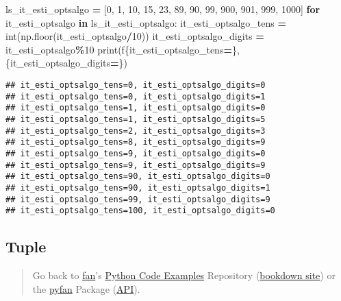 \documentclass[
]{book}
\newenvironment{Shaded}{\begin{snugshade}}{\end{snugshade}}
\newcommand{\BuiltInTok}[1]{#1}
\newcommand{\ControlFlowTok}[1]{\textcolor[rgb]{0.13,0.29,0.53}{\textbf{#1}}}
\newcommand{\DecValTok}[1]{\textcolor[rgb]{0.00,0.00,0.81}{#1}}
\newcommand{\KeywordTok}[1]{\textcolor[rgb]{0.13,0.29,0.53}{\textbf{#1}}}
\newcommand{\NormalTok}[1]{#1}
\newcommand{\OperatorTok}[1]{\textcolor[rgb]{0.81,0.36,0.00}{\textbf{#1}}}
\newcommand{\SpecialCharTok}[1]{\textcolor[rgb]{0.00,0.00,0.00}{#1}}
\newcommand{\SpecialStringTok}[1]{\textcolor[rgb]{0.31,0.60,0.02}{#1}}
\begin{document}
\begin{Shaded}
\begin{Highlighting}[]
\NormalTok{ls\_it\_esti\_optsalgo }\OperatorTok{=}\NormalTok{ [}\DecValTok{0}\NormalTok{, }\DecValTok{1}\NormalTok{, }\DecValTok{10}\NormalTok{, }\DecValTok{15}\NormalTok{, }\DecValTok{23}\NormalTok{, }\DecValTok{89}\NormalTok{, }\DecValTok{90}\NormalTok{, }\DecValTok{99}\NormalTok{, }\DecValTok{900}\NormalTok{, }\DecValTok{901}\NormalTok{, }\DecValTok{999}\NormalTok{, }\DecValTok{1000}\NormalTok{]}
\ControlFlowTok{for}\NormalTok{ it\_esti\_optsalgo }\KeywordTok{in}\NormalTok{ ls\_it\_esti\_optsalgo:}
\NormalTok{    it\_esti\_optsalgo\_tens }\OperatorTok{=} \BuiltInTok{int}\NormalTok{(np.floor(it\_esti\_optsalgo}\OperatorTok{/}\DecValTok{10}\NormalTok{))}
\NormalTok{    it\_esti\_optsalgo\_digits }\OperatorTok{=}\NormalTok{ it\_esti\_optsalgo}\OperatorTok{\%}\DecValTok{10}
    \BuiltInTok{print}\NormalTok{(}\SpecialStringTok{f\textquotesingle{}}\SpecialCharTok{\{}\NormalTok{it\_esti\_optsalgo\_tens}\OperatorTok{=}\SpecialCharTok{\}}\SpecialStringTok{, }\SpecialCharTok{\{}\NormalTok{it\_esti\_optsalgo\_digits}\OperatorTok{=}\SpecialCharTok{\}}\SpecialStringTok{\textquotesingle{}}\NormalTok{)}
\end{Highlighting}
\end{Shaded}

\begin{verbatim}
## it_esti_optsalgo_tens=0, it_esti_optsalgo_digits=0
## it_esti_optsalgo_tens=0, it_esti_optsalgo_digits=1
## it_esti_optsalgo_tens=1, it_esti_optsalgo_digits=0
## it_esti_optsalgo_tens=1, it_esti_optsalgo_digits=5
## it_esti_optsalgo_tens=2, it_esti_optsalgo_digits=3
## it_esti_optsalgo_tens=8, it_esti_optsalgo_digits=9
## it_esti_optsalgo_tens=9, it_esti_optsalgo_digits=0
## it_esti_optsalgo_tens=9, it_esti_optsalgo_digits=9
## it_esti_optsalgo_tens=90, it_esti_optsalgo_digits=0
## it_esti_optsalgo_tens=90, it_esti_optsalgo_digits=1
## it_esti_optsalgo_tens=99, it_esti_optsalgo_digits=9
## it_esti_optsalgo_tens=100, it_esti_optsalgo_digits=0
\end{verbatim}

\hypertarget{tuple}{%
\subsection{Tuple}\label{tuple}}

\begin{quote}
Go back to \href{http://fanwangecon.github.io/}{fan}'s \href{https://fanwangecon.github.io/Py4Econ/}{Python Code Examples} Repository (\href{https://fanwangecon.github.io/Py4Econ/bookdown}{bookdown site}) or the \href{https://pyfan.readthedocs.io/en/latest/}{pyfan} Package (\href{https://pyfan.readthedocs.io/en/latest/reference.html}{API}).
\end{quote}
\end{document}

